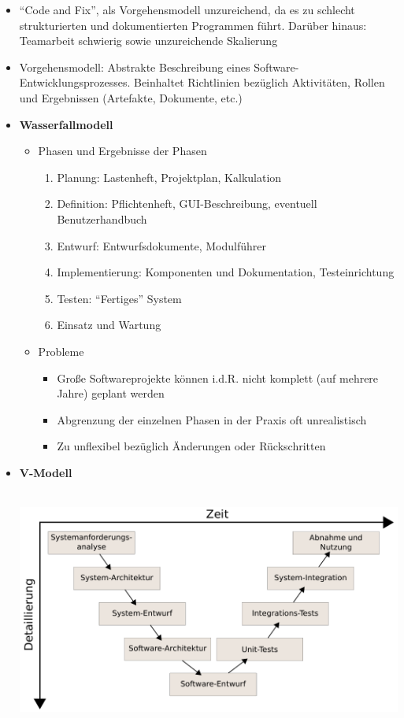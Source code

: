 \begin{itemize}
	\item "`Code and Fix"', als Vorgehensmodell unzureichend, da es zu schlecht strukturierten und dokumentierten Programmen führt. Darüber hinaus: Teamarbeit schwierig sowie unzureichende Skalierung
	\item Vorgehensmodell: Abstrakte Beschreibung eines Software-Entwicklungsprozesses. Beinhaltet Richtlinien bezüglich Aktivitäten, Rollen und Ergebnissen (Artefakte, Dokumente, etc.)
	\item \textbf{Wasserfallmodell}
	\begin{itemize}
		\item Phasen und Ergebnisse der Phasen
		\begin{enumerate}
			\item Planung: Lastenheft, Projektplan, Kalkulation
			\item Definition: Pflichtenheft, GUI-Beschreibung, eventuell Benutzerhandbuch
			\item Entwurf: Entwurfsdokumente, Modulführer
			\item Implementierung: Komponenten und Dokumentation, Testeinrichtung
			\item Testen: "`Fertiges"' System
			\item Einsatz und Wartung
		\end{enumerate}
		\item Probleme
		\begin{itemize}
			\item Große Softwareprojekte können i.d.R. nicht komplett (auf mehrere Jahre) geplant werden
			\item Abgrenzung der einzelnen Phasen in der Praxis oft unrealistisch
			\item Zu unflexibel bezüglich Änderungen oder Rückschritten
		\end{itemize}
	\end{itemize}
	\item \textbf{V-Modell} \\\\
	\begin{minipage}{\linewidth}
		\includegraphics[scale=0.8]{swt2/v-modell.pdf}

\end{minipage}
\end{itemize}
